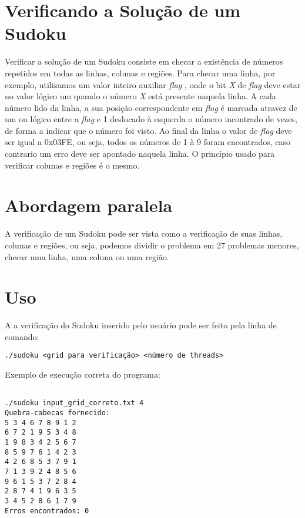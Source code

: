 \documentclass[a4paper, 12pt]{article}
\begin{document}
\section{Verificando a Solução de um Sudoku}

Verificar a solução de um Sudoku consiste em checar a existência de números
repetidos em todas as linhas, colunas e regiões. Para checar uma linha,
por exemplo, utilizamos um valor inteiro auxiliar \textit{flag} , onde o bit
\textit{X} de \textit{flag} deve estar no valor lógico um quando o número \textit{X}
está presente naquela linha.
A cada número lido da linha, a sua posição correspondente em \textit{flag} é
marcada atravez de um ou lógico entre a \textit{flag} e 1 deslocado à esquerda
o número incontrado de vezes, de forma a indicar que o número foi visto.
Ao final da linha o valor de \textit{flag} deve ser igual a 0x03FE, ou seja,
 todos os números de 1 à 9 foram encontrados, caso contrario um erro deve ser
apontado naquela linha. O princípio usado para verificar colunas e regiões é
o mesmo.


\section{Abordagem paralela}
A verificação de um Sudoku pode ser vista como a verificação de suas linhas,
colunas e regiões, ou seja, podemos dividir o problema em 27 problemas menores,
checar uma linha, uma coluna ou uma região.


\section{Uso}

A a verificação do Sudoku inserido pelo usuário pode ser feito pela linha de comando:
\begin{verbatim}
./sudoku <grid para verificação> <número de threads>
\end{verbatim}

Exemplo de execução correta do programa:
\begin{verbatim}

./sudoku input_grid_correto.txt 4
Quebra-cabecas fornecido:
5 3 4 6 7 8 9 1 2
6 7 2 1 9 5 3 4 8
1 9 8 3 4 2 5 6 7
8 5 9 7 6 1 4 2 3
4 2 6 8 5 3 7 9 1
7 1 3 9 2 4 8 5 6
9 6 1 5 3 7 2 8 4
2 8 7 4 1 9 6 3 5
3 4 5 2 8 6 1 7 9
Erros encontrados: 0
\end{verbatim}
\end{document}
